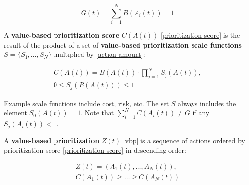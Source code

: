 \documentclass[12pt, a4paper, twocolumn]{article}
\begin{document}
\begin{equation}\label{goal-accomplished}
G(t) = \sum_{i=1}^{N} B(A_i(t)) = 1
\end{equation}

A \textbf{value-based prioritization score} $C(A(t))$ \eqref{prioritization-score} is the result of the product of a set of \textbf{value-based prioritization scale functions} $S = \{S_1, \ldots, S_N\}$ multiplied by \eqref{action-amount}:

\begin{equation}\label{prioritization-score}
  \begin{gathered}
C(A(t)) = B(A(t)) \cdot \prod_{j=1}^{N} S_j(A(t)), \\
0 \leq S_j(B(A(t))) \leq 1
  \end{gathered}
\end{equation}

Example scale functions include cost, risk, etc. The set $S$ always includes the element $S_0(A(t)) = 1$. Note that $\sum_{i=1}^{N} C(A_i(t)) \neq G$ if any $S_j(A_i(t)) < 1$.


A \textbf{value-based prioritization} $Z(t)$ \eqref{vbp} is a sequence of actions ordered by prioritization score \eqref{prioritization-score} in descending order:

\begin{equation}\label{vbp}
  \begin{gathered}
Z(t) = (A_1(t), \ldots, A_N(t)), \\
C(A_1(t)) \geq \ldots \geq C(A_N(t))
  \end{gathered}
\end{equation}
\end{document}
